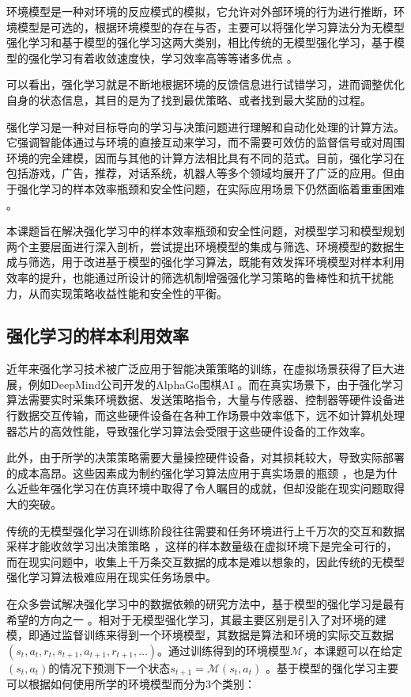 环境模型是一种对环境的反应模式的模拟，它允许对外部环境的行为进行推断，环境模型是可选的，根据环境模型的存在与否，主要可以将强化学习算法分为无模型强化学习和基于模型的强化学习这两大类别，相比传统的无模型强化学习，基于模型的强化学习有着收敛速度快，学习效率高等等诸多优点 \cite{polydoros2017survey}。

可以看出，强化学习就是不断地根据环境的反馈信息进行试错学习，进而调整优化自身的状态信息，其目的是为了找到最优策略、或者找到最大奖励的过程。

强化学习是一种对目标导向的学习与决策问题进行理解和自动化处理的计算方法。它强调智能体通过与环境的直接互动来学习，而不需要可效仿的监督信号或对周围环境的完全建模，因而与其他的计算方法相比具有不同的范式。目前，强化学习在包括游戏，广告，推荐，对话系统，机器人等多个领域均展开了广泛的应用。但由于强化学习的样本效率瓶颈和安全性问题，在实际应用场景下仍然面临着重重困难 \cite{kober2013reinforcement}。

本课题旨在解决强化学习中的样本效率瓶颈和安全性问题，对模型学习和模型规划两个主要层面进行深入剖析，尝试提出环境模型的集成与筛选、环境模型的数据生成与筛选，用于改进基于模型的强化学习算法，既能有效发挥环境模型对样本利用效率的提升，也能通过所设计的筛选机制增强强化学习策略的鲁棒性和抗干扰能力，从而实现策略收益性能和安全性的平衡。

\subsection{强化学习的样本利用效率}

近年来强化学习技术被广泛应用于智能决策策略的训练，在虚拟场景获得了巨大进展，例如DeepMind公司开发的AlphaGo围棋AI \cite{chen2016evolution}。而在真实场景下，由于强化学习算法需要实时采集环境数据、发送策略指令，大量与传感器、控制器等硬件设备进行数据交互传输，而这些硬件设备在各种工作场景中效率低下，远不如计算机处理器芯片的高效性能，导致强化学习算法会受限于这些硬件设备的工作效率。

此外，由于所学的决策策略需要大量操控硬件设备，对其损耗较大，导致实际部署的成本高昂。这些因素成为制约强化学习算法应用于真实场景的瓶颈 \cite{arulkumaran2017deep}，也是为什么近些年强化学习在仿真环境中取得了令人瞩目的成就，但却没能在现实问题取得大的突破。

传统的无模型强化学习在训练阶段往往需要和任务环境进行上千万次的交互和数据采样才能收敛学习出决策策略 \cite{degris2012model}，这样的样本数量级在虚拟环境下是完全可行的，而在现实问题中，收集上千万条交互数据的成本是难以想象的，因此传统的无模型强化学习算法极难应用在现实任务场景中。

在众多尝试解决强化学习中的数据依赖的研究方法中，基于模型的强化学习是最有希望的方向之一 \cite{moerland2020model}。相对于无模型强化学习，其最主要区别是引入了对环境的建模，即通过监督训练来得到一个环境模型，其数据是算法和环境的实际交互数据$(s_t,a_t,r_t,s_{t+1},a_{t+1},r_{t+1},\ldots)$。通过训练得到的环境模型$\mathcal{M}$，本课题可以在给定$(s_t,a_t)$的情况下预测下一个状态$s_{t+1}=\mathcal{M}(s_t,a_t)$ 。基于模型的强化学习主要可以根据如何使用所学的环境模型而分为3个类别：

